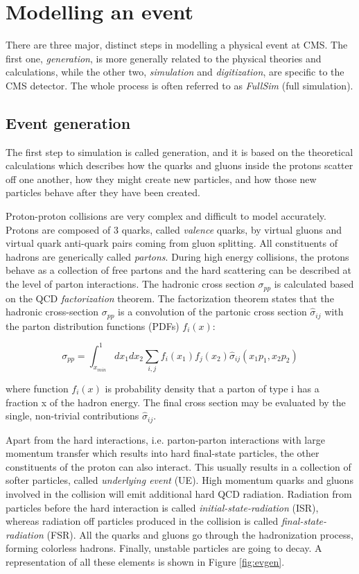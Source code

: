 \section{Modelling an event} \label{sec:modelling}

There are three major, distinct steps in modelling a physical event at CMS. The first one,  \emph{generation}, is more generally related to the physical theories and calculations, while the other two, \emph{simulation} and \emph{digitization}, are specific to the CMS detector. The whole process is often referred to as \emph{FullSim} (full simulation).

\subsection{Event generation}

The first step to simulation is called generation, and it is based on the theoretical calculations which describes how the quarks and gluons inside the protons scatter off one another, how they might create new particles, and how those new particles behave after they have been created. 

Proton-proton collisions are very complex and difficult to model accurately. Protons are
composed of 3 quarks, called \emph{valence} quarks, by virtual gluons and virtual quark anti-quark
pairs coming from gluon splitting. All constituents of hadrons are generically called \emph{partons}.
During high energy collisions, the protons behave as a collection of free partons and the
hard scattering can be described at the level of parton interactions. The hadronic cross
section $\sigma_{pp}$ is calculated based on the QCD \emph{factorization} theorem. The factorization theorem
states that the hadronic cross-section $\sigma_{pp}$ is a convolution of the partonic cross section  $\hat{\sigma}_{ij}$ with the parton distribution functions (PDFs) $f_i(x)$:

\[
\sigma_{pp} = \int_{x_{min}}^1 dx_1 dx_2 \sum_{i,j}f_i(x_1)f_j(x_2)\hat{\sigma}_{ij}(x_1 p_1, x_2 p_2)
\]

where function $f_i(x)$ is probability density that a parton of type i has a fraction x of the
hadron energy. The final cross section may be evaluated by the single, non-trivial contributions $\hat{\sigma}_{ij}$.

Apart from the hard interactions, i.e. parton-parton interactions with large momentum transfer which results into hard final-state particles, the other constituents of the proton can also interact. This
usually results in a collection of softer particles, called \emph{underlying event} (UE). High momentum quarks and gluons involved in the collision will emit additional hard QCD radiation. Radiation
from particles before the hard interaction is called \emph{initial-state-radiation} (ISR), whereas radiation off particles produced in the collision is called \emph{final-state-radiation} (FSR). All the quarks
and gluons go through the hadronization process, forming colorless hadrons. Finally, unstable particles are going to decay. A representation of all these elements is shown in Figure \ref{fig:evgen}.          


